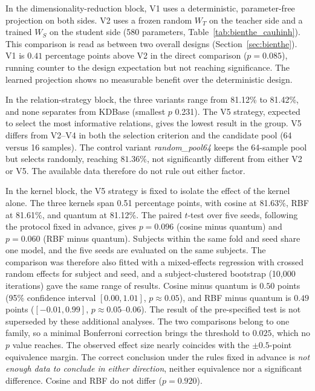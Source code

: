 In the dimensionality-reduction block, V1 uses a deterministic,
parameter-free projection on both sides. V2 uses a frozen random $W_T$ on
the teacher side and a trained $W_S$ on the student side (580 parameters,
Table~\ref{tab:bienthe_cauhinh}). This comparison
is read as between two overall designs (Section~\ref{sec:bienthe}). V1
is $0.41$ percentage points above V2 in the direct comparison
($p = 0.085$), running counter to the design expectation but not
reaching significance. The learned projection shows no measurable
benefit over the deterministic design.

In the relation-strategy block, the three variants range from 81.12\%
to 81.42\%, and none separates from KDBase (smallest $p$ 0.231). The V5
strategy, expected to select the most informative relations, gives the
lowest result in the group. V5 differs from V2--V4 in both the
selection criterion and the candidate pool (64 versus 16 samples). The
control variant \emph{random\_pool64} keeps the 64-sample pool but
selects randomly, reaching $81.36\%$, not significantly different from
either V2 or V5. The available data therefore do not rule out either
factor.

In the kernel block, the V5 strategy is fixed to isolate the effect of
the kernel alone. The three kernels span 0.51 percentage points, with
cosine at 81.63\%, RBF at 81.61\%, and quantum at 81.12\%. The paired
$t$-test over five seeds, following the protocol fixed in advance, gives
$p = 0.096$ (cosine minus quantum) and $p = 0.060$ (RBF minus quantum).
Subjects within the same fold and seed share one model, and the five
seeds are evaluated on the same subjects. The comparison was therefore also
fitted with a mixed-effects regression with crossed random effects for
subject and seed, and a subject-clustered bootstrap (10,000 iterations)
gave the same range of results. Cosine minus quantum
is $0.50$ points (95\% confidence interval $[0.00, 1.01]$,
$p \approx 0.05$), and RBF minus quantum is $0.49$ points
($[-0.01, 0.99]$, $p \approx 0.05$--$0.06$). The result of the
pre-specified test is not superseded by these additional analyses. The
two comparisons belong to one family, so a minimal Bonferroni
correction brings the threshold to $0.025$, which no $p$ value reaches.
The observed effect size nearly coincides with the $\pm 0.5$-point
equivalence margin. The correct conclusion under the rules fixed in
advance is \emph{not enough data to conclude in either direction},
neither equivalence nor a significant difference. Cosine and RBF do not
differ ($p = 0.920$).

